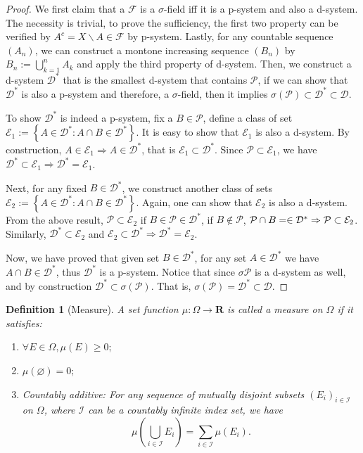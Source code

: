 \documentclass[11pt,english]{smfart}
\newtheorem{definition}[theorem]{Definition}
\newcommand{\mc}{\mathcal}
\newcommand{\mf}{\mathbf}
\begin{document}
\begin{proof}
    We first claim that a $\mc{F}$ is a $\sigma$-field iff it is a p-system and also a d-system. The necessity is trivial, to prove the sufficiency, the first two property can be verified by $A^c = X \backslash A \in \mc{F}$ by p-system. Lastly, for any countable sequence $(A_n)$, we can construct a montone increasing sequence $(B_n)$ by $B_n := \bigcup_{k=1}^n A_k$ and apply the third property of d-system. Then, we construct a d-system $\mc{D}^*$ that is the smallest d-system that contains $\mc{P}$, if we can show that $\mc{D}^*$ is also a p-system and therefore, a $\sigma$-field, then it implies $\sigma(\mc{P}) \subset \mc{D}^* \subset \mc{D}$. 

    To show $\mc{D}^* $ is indeed a p-system, fix a $B\in \mc{P}$, define a class of set $\mc{E}_1 := \left\{A\in \mc{D}^*: A \cap B \in \mc{D}^*\right\}$. It is easy to show that $\mc{E}_1$ is also a d-system. By construction, $A\in \mc{E}_1 \Rightarrow A\in \mc{D}^*$, that is $\mc{E}_1 \subset \mc{D}^*$. Since $\mc{P} \subset \mc{E}_1$, we have $\mc{D}^* \subset \mc{E}_1 \Rightarrow \mc{D}^* = \mc{E}_1$. 

    Next, for any fixed $B\in \mc{D}^*$, we construct another class of sets $\mc{E}_2 := \left\{A\in \mc{D}^* : A\cap B \in \mc{D}^*\right\}$. Again, one can show that $\mc{E}_2$ is also a d-system. From the above result, $\mc{P} \subset \mc{E}_2$ if $B\in \mc{P}\in \mc{D}^*$, if $B\notin \mc{P}$, $\mc{P} \cap B = \empty \in \mc{D}^* \Rightarrow \mc{P} \subset \mc{E}_2$. Similarly, $\mc{D}^* \subset \mc{E}_2$ and $\mc{E}_2 \subset \mc{D}^* \Rightarrow \mc{D}^* = \mc{E}_2$. 
    
    Now, we have proved that given set $B\in\mc{D}^*$, for any set $A\in \mc{D}^*$ we have $A\cap B \in \mc{D}^*$, thus $\mc{D}^*$ is a p-system. Notice that since $\sigma{\mc{P}}$ is a d-system as well, and by construction $\mc{D}^* \subset \sigma(\mc{P})$. That is, $\sigma(\mc{P}) = \mc{D}^* \subset \mc{D}$.


\end{proof}

\begin{definition}[Measure]
    A set function $\mu: \Omega \rightarrow \mf{R}$  is called a measure on $\Omega$ if it satisfies:
    \begin{enumerate}[(a.)]
        \item $\forall E \in \Omega, \mu(E) \geq 0;$
        \item $\mu(\varnothing ) = 0;$
        \item Countably additive: For any sequence of mutually disjoint subsets $(E_i)_{i\in \mathcal{I}}$ on $\Omega$, where $\mathcal{I}$ can be a countably infinite index set, we have $$\mu\left(\bigcup_{i\in \mathcal{I}}E_i\right) = \sum_{i\in \mathcal{I}}\mu(E_i).$$
    \end{enumerate}
\end{definition}
\end{document}
